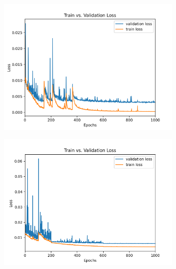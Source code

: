 \documentclass{article}
\begin{document}
\begin{figure}[!htb]
    \centering
    \begin{subfigure}[b]{0.48\textwidth}
        \centering
        \includegraphics[width=\textwidth]{figs/ClassicUnet/curves/loss_curve.png}
        \caption{}
        \label{fig:loss_curve_HyperNet_model}
    \end{subfigure}
    \hfill
    \begin{subfigure}[b]{0.48\textwidth}
        \centering
        \includegraphics[width=\textwidth]{figs/ReducedUnet/loss_curves/loss_curve.png}
        \caption{}
        \label{fig:loss_curve_ReducedUnet_model}
    \end{subfigure}
    

\end{figure}
\end{document}
